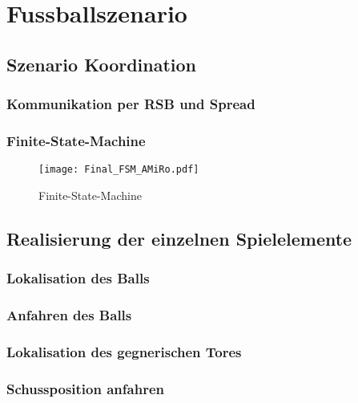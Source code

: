 \chapter{Fussballszenario} \label{kap:Fussballszenario} %

\section{Szenario Koordination} %

\subsection{Kommunikation per RSB und Spread} %

\subsection{Finite-State-Machine} %

\begin{figure}[H]
	\begin{center}
		\texttt{[image: Final\_FSM\_AMiRo.pdf]} 	
		\caption{Finite-State-Machine}
		\label{fig:fsm-amiro}
	\end{center}
\end{figure}

\section{Realisierung der einzelnen Spielelemente} %

\subsection{Lokalisation des Balls} %

\subsection{Anfahren des Balls} %

\subsection{Lokalisation des gegnerischen Tores} %

\subsection{Schussposition anfahren} %

